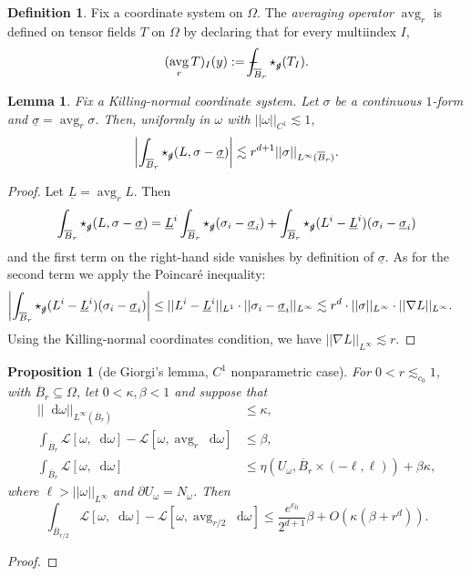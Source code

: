 \documentclass[reqno,12pt,letterpaper]{amsart}
\DeclareMathOperator{\avg}{avg}
\newcommand*\dif{\mathop{}\!\mathrm{d}}
\newcommand{\Lagrange}{\mathscr L}
\newcommand{\dfn}[1]{\emph{#1}\index{#1}}
\newtheorem{lemma}[theorem]{Lemma}
\newtheorem{proposition}[theorem]{Proposition}
\theoremstyle{definition}
\newtheorem{definition}[theorem]{Definition}
\numberwithin{equation}{section}
\def\Xint#1{\mathchoice
{\XXint\displaystyle\textstyle{#1}}%
{\XXint\textstyle\scriptstyle{#1}}%
{\XXint\scriptstyle\scriptscriptstyle{#1}}%
{\XXint\scriptscriptstyle\scriptscriptstyle{#1}}%
\!\int}
\def\XXint#1#2#3{{\setbox0=\hbox{$#1{#2#3}{\int}$ }
\vcenter{\hbox{$#2#3$ }}\kern-.6\wd0}}
\def\dashint{\Xint-}
\begin{document}
\begin{definition}
Fix a coordinate system on $\Omega$.
The \dfn{averaging operator} $\avg_r$ is defined on tensor fields $T$ on $\Omega$ by declaring that for every multiindex $I$,
$$(\avg_r T)_I(y) := \dashint_{\overline B_r} \star_{\slashed g} (T_I).$$
\end{definition}

\begin{lemma}
Fix a Killing-normal coordinate system.
Let $\sigma$ be a continuous $1$-form and $\underline \sigma = \avg_r \sigma$. Then, uniformly in $\omega$ with $||\omega||_{C^1} \lesssim 1$,
$$\left|\int_{\overline B_r} \star_{\slashed g} (L, \sigma - \underline \sigma) \right| \lesssim r^{d + 1} ||\sigma||_{L^\infty(\overline B_r)}.$$
\end{lemma}
\begin{proof}
Let $\underline L = \avg_r L$. Then
$$\int_{\overline B_r} \star_{\slashed g} (L, \sigma - \underline \sigma) = \underline L^i \int_{\overline B_r} \star_{\slashed g} (\sigma_i - \underline \sigma_i) + \int_{\overline B_r} \star_{\slashed g} (L^i - \underline L^i)(\sigma_i - \underline \sigma_i)$$
and the first term on the right-hand side vanishes by definition of $\underline \sigma$.
As for the second term we apply the Poincar\'e inequality:
\begin{align*}
\left|\int_{\overline B_r} \star_{\slashed g} (L^i - \underline L^i)(\sigma_i - \underline \sigma_i)\right| &\leq ||L^i - \underline L^i||_{L^1} \cdot ||\sigma_i - \underline \sigma_i||_{L^\infty} \lesssim r^d \cdot ||\sigma||_{L^\infty} \cdot ||\nabla L||_{L^\infty}.
\end{align*}
Using the Killing-normal coordinates condition, we have $||\nabla L||_{L^\infty} \lesssim r$.
\end{proof}



\begin{proposition}[de Giorgi's lemma, $C^1$ nonparametric case]\label{dGL Laplace}
For $0 < r \lesssim_{c_0} 1$, with $\overline B_r \subseteq \Omega$, let $0 < \kappa, \beta < 1$ and suppose that
\begin{align}
||\dif \omega||_{L^\infty(\overline B_r)} &\leq \kappa, \label{dGL Linfty}\\
\int_{\overline B_r} \Lagrange[\omega, \dif \omega] - \Lagrange[\omega, \avg_r \dif \omega] &\leq \beta, \label{dGL osc}\\
\int_{\overline B_r} \Lagrange[\omega, \dif \omega] &\leq \eta(U_\omega, \overline B_r \times (-\ell, \ell)) + \beta\kappa, \label{dGL mean curv}
\end{align}
where $\ell > ||\omega||_{L^\infty}$ and $\partial U_\omega = N_\omega$. Then
\begin{equation}\label{dGL cons}
\int_{\overline B_{r/2}} \Lagrange[\omega, \dif \omega] - \Lagrange[\omega, \avg_{r/2} \dif \omega] \leq \frac{e^{c_0}}{2^{d + 1}} \beta + O(\kappa (\beta + r^d)).
\end{equation}
\end{proposition}
\begin{proof}

\end{proof}
\end{document}
